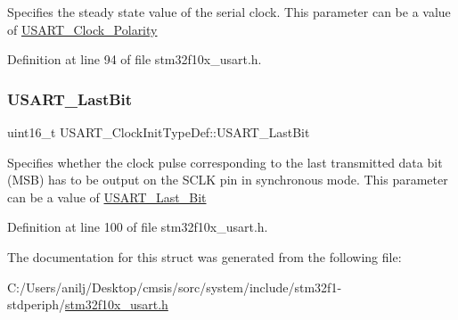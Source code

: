 Specifies the steady state value of the serial clock. This parameter can be a value of \hyperlink{group___u_s_a_r_t___clock___polarity}{U\+S\+A\+R\+T\+\_\+\+Clock\+\_\+\+Polarity} 

Definition at line 94 of file stm32f10x\+\_\+usart.\+h.

\mbox{\label{struct_u_s_a_r_t___clock_init_type_def_ab1b28d63d2be6e57849666d78a4467bd}} 
\subsubsection{\texorpdfstring{U\+S\+A\+R\+T\+\_\+\+Last\+Bit}{USART\_LastBit}}
{\footnotesize\ttfamily uint16\+\_\+t U\+S\+A\+R\+T\+\_\+\+Clock\+Init\+Type\+Def\+::\+U\+S\+A\+R\+T\+\_\+\+Last\+Bit}

Specifies whether the clock pulse corresponding to the last transmitted data bit (M\+SB) has to be output on the S\+C\+LK pin in synchronous mode. This parameter can be a value of \hyperlink{group___u_s_a_r_t___last___bit}{U\+S\+A\+R\+T\+\_\+\+Last\+\_\+\+Bit} 

Definition at line 100 of file stm32f10x\+\_\+usart.\+h.



The documentation for this struct was generated from the following file\+:\begin{DoxyCompactItemize}
\item 
C\+:/\+Users/anilj/\+Desktop/cmsis/sorc/system/include/stm32f1-\/stdperiph/\hyperlink{stm32f10x__usart_8h}{stm32f10x\+\_\+usart.\+h}\end{DoxyCompactItemize}
